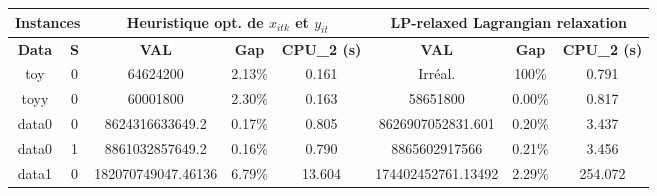 \begin{table}[h!tbp]
    \centering\small
    \renewcommand{\arraystretch}{1.1}
    \begin{tabular}{|c|c||c|c|c||c|c|c|}
        \hline
        \multicolumn{2}{|c||}{\textbf{Instances}} & \multicolumn{3}{|c||}{\textbf{Heuristique opt. de $x_{itk}$ et $y_{it}$}} & \multicolumn{3}{|c|}{\textbf{LP-relaxed Lagrangian relaxation}}                                                                                                \\
        \hline
        \textbf{Data}                             & \textbf{S}                                                                & \textbf{VAL}                                                    & \textbf{Gap} & \textbf{CPU\_2 (s)} & \textbf{VAL}       & \textbf{Gap} & \textbf{CPU\_2 (s)} \\
        \hline
        toy                                       & 0                                                                         & 64624200                                                        & 2.13\%       & 0.161               & Irréal.            & 100\%        & 0.791               \\
        \hline
        toyy                                      & 0                                                                         & 60001800                                                        & 2.30\%       & 0.163               & 58651800           & 0.00\%       & 0.817               \\
        \hline
        data0                                     & 0                                                                         & 8624316633649.2                                                 & 0.17\%       & 0.805               & 8626907052831.601  & 0.20\%       & 3.437               \\
        data0                                     & 1                                                                         & 8861032857649.2                                                 & 0.16\%       & 0.790               & 8865602917566      & 0.21\%       & 3.456               \\
        \hline
        data1                                     & 0                                                                         & 182070749047.46136                                              & 6.79\%       & 13.604              & 174402452761.13492 & 2.29\%       & 254.072             \\

\end{tabular}
\end{table}
